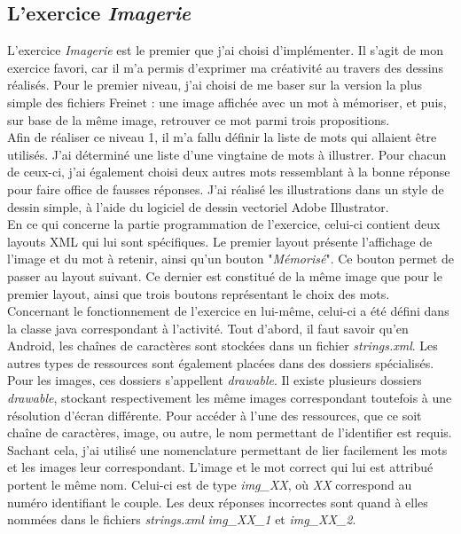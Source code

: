\subsection{L'exercice \textit{Imagerie}}
L'exercice \textit{Imagerie} est le premier que j'ai choisi d'implémenter. Il s'agit de mon exercice favori, car il m'a permis d'exprimer ma créativité au travers des dessins réalisés. Pour le premier niveau, j'ai choisi de me baser sur la version la plus simple des fichiers Freinet : une image affichée avec un mot à mémoriser, et puis, sur base de la même image, retrouver ce mot parmi trois propositions.\\

Afin de réaliser ce niveau 1, il m'a fallu définir la liste de mots qui allaient être utilisés. J'ai déterminé une liste d'une vingtaine de mots à illustrer. Pour chacun de ceux-ci, j'ai également choisi deux autres mots ressemblant à la bonne réponse pour faire office de fausses réponses. J'ai réalisé les illustrations dans un style de dessin simple, à l'aide du logiciel de dessin vectoriel Adobe Illustrator. \\


En ce qui concerne la partie programmation de l'exercice, celui-ci contient deux layouts XML qui lui sont spécifiques. Le premier layout présente l'affichage de l'image et du mot à retenir, ainsi qu'un bouton "\textit{Mémorisé}". Ce bouton permet de passer au layout suivant. Ce dernier est constitué de la même image que pour le premier layout, ainsi que trois boutons représentant le choix des mots.\\

Concernant le fonctionnement de l'exercice en lui-même, celui-ci a été défini dans la classe java correspondant à l'activité. Tout d'abord, il faut savoir qu'en Android, les chaînes de caractères sont stockées dans un fichier \textit{strings.xml}. Les autres types de ressources sont également placées dans des dossiers spécialisés. Pour les images, ces dossiers s'appellent \textit{drawable}. Il existe plusieurs dossiers \textit{drawable}, stockant respectivement les même images correspondant toutefois à une résolution d'écran différente. Pour accéder à l'une des ressources, que ce soit chaîne de caractères, image, ou autre, le nom permettant de l'identifier est requis. Sachant cela, j'ai utilisé une nomenclature permettant de lier facilement les mots et les images leur correspondant. L'image et le mot correct qui lui est attribué portent le même nom. Celui-ci est de type \textit{img\_XX}, où \textit{XX} correspond au numéro identifiant le couple. Les deux réponses incorrectes sont quand à elles nommées dans le fichiers \textit{strings.xml} \textit{img\_XX\_1} et \textit{img\_XX\_2}.\\

